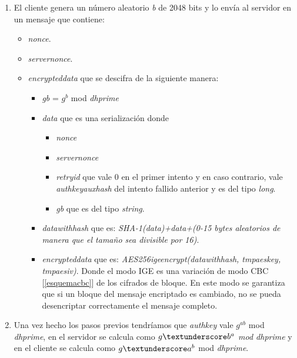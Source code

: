 \begin{enumerate}
	\item El cliente genera un número aleatorio \emph{b} de 2048 bits y lo envía al servidor en un mensaje que contiene:
		\begin{itemize}
			\item \emph{nonce}.
			\item \emph{server\textunderscore nonce}.
			\item \emph{encrypted\textunderscore data} que se descifra de la siguiente manera:
				\begin{itemize}
					\item \emph{g\textunderscore b} = $g^b$ mod \emph{dh\textunderscore prime}
					\item \emph{data} que es una serialización donde
						\begin{itemize}
							\item \emph{nonce}
							\item \emph{server\textunderscore nonce}
							\item \emph{retry\textunderscore id} que vale 0 en el primer intento y en caso contrario, vale \emph{auth\textunderscore key\textunderscore aux\textunderscore hash} del intento fallido anterior y es del tipo \emph{long}.
							\item \emph{g\textunderscore b} que es del tipo \emph{string}.
						\end{itemize}
					\item \emph{data\textunderscore with\textunderscore hash} que es: \emph{SHA-1(data)+data+(0-15 bytes aleatorios de manera que el tamaño sea divisible por 16)}.
					\item \emph{encrypted\textunderscore data} que es: \emph{AES256\textunderscore ige\textunderscore encrypt(data\textunderscore with\textunderscore hash, tmp\textunderscore aes\textunderscore key, tmp\textunderscore aes\textunderscore iv)}. Donde el modo IGE es una variación de modo CBC [\ref{esquemacbc}] de los cifrados de bloque. En este modo se garantiza que si un bloque del mensaje encriptado es cambiado, no se pueda desencriptar correctamente el mensaje completo.
				\end{itemize}
		\end{itemize}
	\item Una vez hecho los pasos previos tendríamos que \emph{auth\textunderscore key} vale $g^{ab}$ mod \emph{dh\textunderscore prime}, en el servidor se calcula como \emph{$g\textunderscore b^{a}$ mod \emph{dh\textunderscore prime}} y en el cliente se calcula como $g\textunderscore a^b$ mod \emph{dh\textunderscore prime}.

\end{enumerate}
